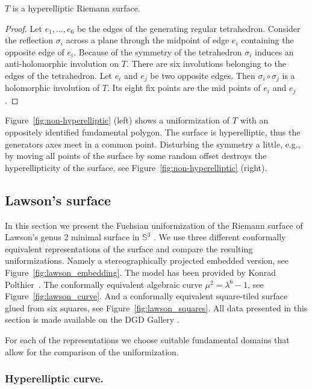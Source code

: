 \documentclass[Thesis]{subfiles}
\begin{document}
\begin{proposition}
$T$ is a hyperelliptic Riemann surface.
\end{proposition}

\begin{proof}
Let $e_1,\ldots,e_6$ be the edges of the generating regular tetrahedron. Consider the reflection $\sigma_i$ across a plane through the midpoint of edge $e_i$ containing the opposite edge of $e_i$.  Because of the symmetry of the tetrahedron $\sigma_i$ induces an anti-holomorphic involution on $T$. There are six involutions belonging to the edges of the tetrahedron. Let $e_i$ and $e_j$ be two opposite edges. Then $\sigma_i \circ \sigma_j$ is a holomorphic involution of $T$. Its eight fix points are the mid points of $e_i$ and $e_j$.
\end{proof}

Figure~\ref{fig:non-hyperelliptic} (left) shows a uniformization of $T$ with an oppositely identified fundamental polygon. The surface is hyperelliptic, thus the generators axes meet in a common point. Disturbing the symmetry a little, e.g., by moving all points of the surface by some random offset destroys the hyperellipticity of the surface, see Figure~\ref{fig:non-hyperelliptic} (right).

\subsection{Lawson's surface}
\label{sec:lawson_uniformization}

In this section we present the Fuchsian uniformization of the Riemann surface of Lawson's genus 2 minimal surface in $\mathbb{S}^3$ \cite{Law1970}.
We use three different conformally equivalent representations of the surface and compare the resulting uniformizations.
Namely a stereographically projected embedded version, see Figure~\ref{fig:lawson_embedding}.
The model has been provided by Konrad Polthier~\cite{polthier97}.
The conformally equivalent algebraic curve $\mu^2=\lambda^6-1$, see Figure~\ref{fig:lawson_curve}.
And a conformally equivalent square-tiled surface glued from six squares, see Figure~\ref{fig:lawson_squares}.
All data presented in this section is made available on the {\sc DGD Gallery} \cite{gallery-lawson-webpage}.

For each of the representations we choose suitable fundamental domains that allow for the comparison of the uniformization.

\subsubsection{Hyperelliptic curve.}
\label{sec:lawson_curve}
\end{document}
